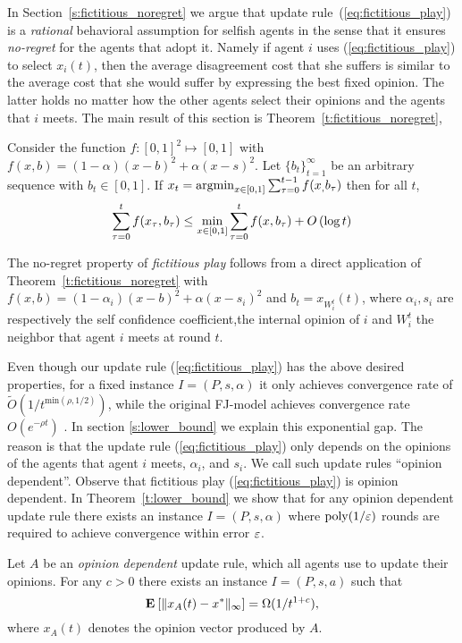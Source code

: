 In Section~\ref{s:fictitious_noregret} we argue that update rule~(\ref{eq:fictitious_play})
is a \emph{rational} behavioral assumption for selfish agents in the sense that 
it ensures \emph{no-regret} for the agents that adopt it. Namely if agent $i$ uses (\ref{eq:fictitious_play})
to select $x_i(t)$, then the average disagreement cost that she suffers is similar to the average cost that she would suffer 
by expressing the best fixed opinion. The latter holds no matter how the other agents select
their opinions and the agents that $i$ meets. The main result of this section is Theorem~\ref{t:fictitious_noregret},
\begin{theorem}\label{t:fictitious_noregret}
Consider the function $f:[0,1]^2 \mapsto [0,1]$ with $f(x,b) = (1-\alpha)(x-b)^2 + \alpha(x-s)^2$.
Let $\{b_t\}_{t=1}^\infty$ be an arbitrary sequence with $b_t \in [0,1]$. If $x_t = \operatorname*{argmin}_{x \in [0,1]}\sum_{\tau=0}^{t-1}f(x_,b_\tau)$
then for all $t$, 
\[\sum_{\tau=0}^{t}f(x_\tau,b_\tau) \leq \min_{x \in [0,1]}\sum_{\tau=0}^tf(x,b_\tau) + O\left(\log t\right)\]
\end{theorem}
The no-regret property of \emph{fictitious play} follows from a direct application of Theorem~\ref{t:fictitious_noregret} 
with $f(x,b) = (1-\alpha_i)(x-b)^2 + \alpha(x-s_i)^2$ and $b_t = x_{W_i^t}(t)$, where $\alpha_i,s_i$ are 
respectively the self confidence coefficient,the internal opinion of $i$ and $W_i^t$ the neighbor 
that agent $i$ meets at round $t$.

Even though our update rule (\ref{eq:fictitious_play}) has the above
desired properties, for a fixed instance $I=(P,s,\alpha)$ it only achieves convergence rate of
$\widetilde{O}(1/t^{\text{min}(\rho,1/2)})$, while the original FJ-model
achieves convergence rate $O(e^{-\rho t})$ \cite{GS14}.
In section \ref{s:lower_bound} we explain this exponential gap.
The reason is that the update rule (\ref{eq:fictitious_play})
only depends on the opinions of the agents that agent $i$ meets,
$\alpha_i$, and $s_i$. We call such update rules \enquote{opinion dependent}.
Observe that fictitious play (\ref{eq:fictitious_play}) is opinion dependent.
  In Theorem~\ref{t:lower_bound} we
show that for any opinion dependent update rule there exists an instance
$I = (P,s,\alpha)$ where $\mathrm{poly}(1/\varepsilon)$ rounds are required to
achieve convergence within error $\varepsilon$.
\begin{theorem}\label{t:lower_bound}
  Let $A$ be an \emph{opinion dependent} update rule, which all
  agents use to update their opinions.
  For any $c>0$ there exists an instance $I=(P,s,a)$ such that
  \[
    \Exp{\norm{\infty}{x_A(t) - x^*}} = \Omega(1/t^{1+c}),
  \]
where $x_A(t)$ denotes the opinion vector produced by $A$.
\end{theorem}

